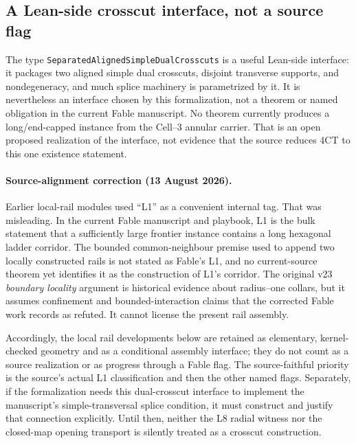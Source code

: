 \documentclass[11pt]{article}
\theoremstyle{definition}
\begin{document}
\subsection{A Lean-side crosscut interface, not a source flag}

The type \texttt{SeparatedAlignedSimpleDualCrosscuts} is a useful Lean-side
interface: it packages two aligned simple dual crosscuts, disjoint transverse
supports, and nondegeneracy, and much splice machinery is parametrized by it.
It is nevertheless an interface chosen by this formalization, not a theorem or
named obligation in the current Fable manuscript.  No theorem currently
produces a long/end-capped instance from the Cell--3 annular carrier.  That is
an open proposed realization of the interface, not evidence that the source
reduces 4CT to this one existence statement.

\paragraph{Source-alignment correction (13 August 2026).}
Earlier local-rail modules used ``L1'' as a convenient internal tag.  That
was misleading.  In the current Fable manuscript and playbook, L1 is the
bulk statement that a sufficiently large frontier instance contains a long
hexagonal ladder corridor.  The bounded common-neighbour premise used to
append two locally constructed rails is not stated as Fable's L1, and no
current-source theorem yet identifies it as the construction of L1's
corridor.  The original v23 \emph{boundary locality} argument is historical
evidence about radius--one collars, but it assumes confinement and
bounded-interaction claims that the corrected Fable work records as refuted.
It cannot license the present rail assembly.

Accordingly, the local rail developments below are retained as elementary,
kernel-checked geometry and as a conditional assembly interface; they do not
count as a source realization or as progress through a Fable flag.  The
source-faithful priority is the source's actual L1 classification and then the
other named flags.  Separately, if the formalization needs this dual-crosscut
interface to implement the manuscript's simple-transversal splice condition,
it must construct and justify that connection explicitly.  Until then, neither
the L8 radial witness nor the closed-map opening transport is silently treated
as a crosscut construction.
\end{document}
